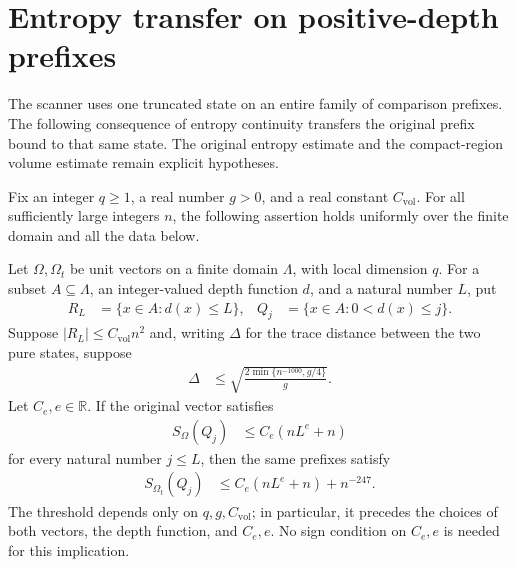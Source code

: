 \section{Entropy transfer on positive-depth prefixes}

The scanner uses one truncated state on an entire family of comparison
prefixes. The following consequence of entropy continuity transfers the
original prefix bound to that same state. The original entropy estimate
and the compact-region volume estimate remain explicit hypotheses.

\begin{lemma}
    \label{thm:al_positive_prefix_entropy_transfer}
    \leanok
    Fix an integer $q\ge1$, a real number $g>0$, and a real constant
    $C_{\mathrm{vol}}$. For all sufficiently large integers $n$, the
    following assertion holds uniformly over the finite domain and all
    the data below.

    Let $\Omega,\Omega_t$ be unit vectors on a finite domain $\Lambda$,
    with local dimension $q$. For a subset $A\subseteq\Lambda$, an
    integer-valued depth function $d$, and a natural number $L$, put
    \begin{align}
        R_L & =\{x\in A:d(x)\le L\},   &
        Q_j & =\{x\in A:0<d(x)\le j\}.
    \end{align}
    Suppose $|R_L|\le C_{\mathrm{vol}}n^2$ and, writing $\Delta$ for
    the trace distance between the two pure states, suppose
    \begin{align}
        \Delta & \le
        \sqrt{\frac{2\min\{n^{-1000},g/4\}}{g}}.
    \end{align}
    Let $C_e,e\in\mathbb R$. If the original vector satisfies
    \begin{align}
        S_\Omega(Q_j) & \le C_e(nL^e+n)
    \end{align}
    for every natural number $j\le L$, then the same prefixes satisfy
    \begin{align}
        S_{\Omega_t}(Q_j) & \le C_e(nL^e+n)+n^{-247}.
    \end{align}
    The threshold depends only on $q,g,C_{\mathrm{vol}}$; in particular,
    it precedes the choices of both vectors, the depth function, and
    $C_e,e$. No sign condition on $C_e,e$ is needed for this implication.
\end{lemma}
